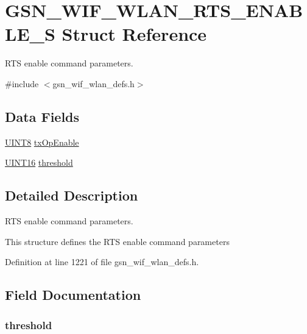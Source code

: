 \hypertarget{a00396}{
\section{GSN\_\-WIF\_\-WLAN\_\-RTS\_\-ENABLE\_\-S Struct Reference}
\label{a00396}
}


RTS enable command parameters.  




{\ttfamily \#include $<$gsn\_\-wif\_\-wlan\_\-defs.h$>$}

\subsection*{Data Fields}
\begin{DoxyCompactItemize}
\item 
\hyperlink{a00660_gab27e9918b538ce9d8ca692479b375b6a}{UINT8} \hyperlink{a00396_a14581b53a42859038066f83224be00b7}{txOpEnable}
\item 
\hyperlink{a00660_ga09f1a1fb2293e33483cc8d44aefb1eb1}{UINT16} \hyperlink{a00396_a833ce33c37869ebd2c148a0c2cd575b1}{threshold}
\end{DoxyCompactItemize}


\subsection{Detailed Description}
RTS enable command parameters. 

This structure defines the RTS enable command parameters 

Definition at line 1221 of file gsn\_\-wif\_\-wlan\_\-defs.h.



\subsection{Field Documentation}
\hypertarget{a00396_a833ce33c37869ebd2c148a0c2cd575b1}{
\subsubsection[{threshold}]{ {\bf threshold}}}
\label{a00396_a833ce33c37869ebd2c148a0c2cd575b1}



